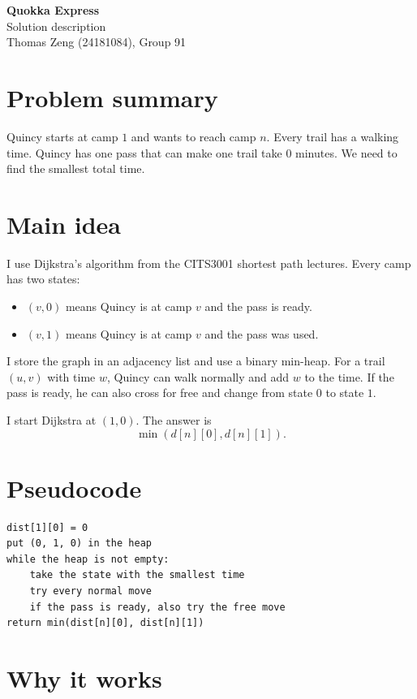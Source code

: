 \documentclass[10pt,a4paper]{article}
\begin{document}
\begin{center}
{\Large\textbf{Quokka Express}}\\
Solution description\\
Thomas Zeng (24181084), Group 91
\end{center}

\section*{Problem summary}

Quincy starts at camp $1$ and wants to reach camp $n$. Every trail has a walking time. Quincy has one pass that can make one trail take $0$ minutes. We need to find the smallest total time.

\section*{Main idea}

I use Dijkstra's algorithm from the CITS3001 shortest path lectures. Every camp has two states:

\begin{itemize}
    \item $(v,0)$ means Quincy is at camp $v$ and the pass is ready.
    \item $(v,1)$ means Quincy is at camp $v$ and the pass was used.
\end{itemize}

I store the graph in an adjacency list and use a binary min-heap. For a trail $(u,v)$ with time $w$, Quincy can walk normally and add $w$ to the time. If the pass is ready, he can also cross for free and change from state $0$ to state $1$.

I start Dijkstra at $(1,0)$. The answer is
\[
\min(d[n][0],d[n][1]).
\]

\section*{Pseudocode}

\begin{verbatim}
dist[1][0] = 0
put (0, 1, 0) in the heap
while the heap is not empty:
    take the state with the smallest time
    try every normal move
    if the pass is ready, also try the free move
return min(dist[n][0], dist[n][1])
\end{verbatim}

\section*{Why it works}
\end{document}
